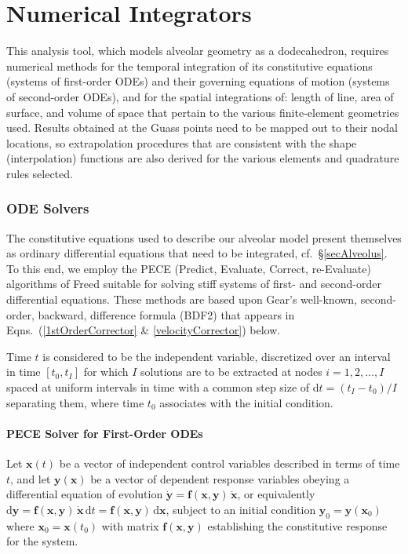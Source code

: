 \part{Numerical Integrators}
\label{partNumericalMethods}

This analysis tool, which models alveolar geometry as a dodecahedron, requires numerical methods for the temporal integration of its constitutive equations (systems of first-order ODEs) and their governing equations of motion (systems of second-order ODEs), and for the spatial integrations of: length of line, area of surface, and volume of space that pertain to the various finite-element geometries used.  Results obtained at the Guass points need to be mapped out to their nodal locations, so extrapolation procedures that are consistent with the shape (interpolation) functions are also derived for the various elements and quadrature rules selected.

\section{ODE Solvers}

The constitutive equations used to describe our alveolar model present themselves as ordinary differential equations that need to be integrated, cf.\ \S\ref{secAlveolus}.  To this end, we employ the PECE (Predict, Evaluate, Correct, re-Evaluate) algorithms of Freed \cite{Freed17a} suitable for solving stiff systems of first- and second-order differential equations.  These methods are based upon Gear's well-known, second-order, backward, difference formula (BDF2) that appears in Eqns.~(\ref{1stOrderCorrector} \& \ref{velocityCorrector}) below.

Time $t$ is considered to be the independent variable, discretized over an interval in time $[t_0, t_I]$ for which $I$ solutions are to be extracted at nodes $i=1, 2, \ldots, I$ spaced at uniform intervals in time with a common step size of $\mathrm{d}t = (t_I - t_0)/I$ separating them, where time $t_0$ associates with the initial condition.

\subsection{PECE Solver for First-Order ODEs}
\label{sec:1stOrderPECE}

Let $\mathbf{x}(t)$ be a vector of independent control variables described in terms of time $t$, and let $\mathbf{y} (\mathbf{x})$ be a vector of dependent response variables obeying a differential equation of evolution $\dot{\mathbf{y}} = \mathbf{f} (\mathbf{x}, \mathbf{y}) \, \dot{\mathbf{x}}$, or equivalently $\mathrm{d} \mathbf{y} = \mathbf{f} (\mathbf{x}, \mathbf{y}) \, \dot{\mathbf{x}} \, \mathrm{d} t = \mathbf{f} (\mathbf{x}, \mathbf{y}) \, \mathrm{d}\mathbf{x}$, subject to an initial condition $\mathbf{y}_0 = \mathbf{y}(\mathbf{x}_0)$ where $\mathbf{x}_0 = \mathbf{x} (t_0)$ with matrix $\mathbf{f} (\mathbf{x}, \mathbf{y})$ establishing the constitutive response for the system.

